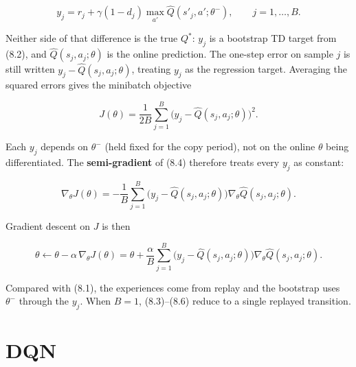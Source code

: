 \begin{equation}
y_j
=
r_j
+
\gamma(1-d_j)\max_{a'}\hat{Q}(s'_j,a';\theta^-),
\qquad
j=1,\ldots,B.
\tag{8.3}
\end{equation}

Neither side of that difference is the true $Q^*$: $y_j$ is a bootstrap TD target from (8.2), and $\hat{Q}(s_j,a_j;\theta)$ is the online prediction. The one-step error on sample $j$ is still written $y_j-\hat{Q}(s_j,a_j;\theta)$, treating $y_j$ as the regression target. Averaging the squared errors gives the minibatch objective

\begin{equation}
J(\theta)
=
\frac{1}{2B}
\sum_{j=1}^{B}
\bigl(y_j-\hat{Q}(s_j,a_j;\theta)\bigr)^2.
\tag{8.4}
\end{equation}

Each $y_j$ depends on $\theta^-$ (held fixed for the copy period), not on the online $\theta$ being differentiated. The \textbf{semi-gradient} of (8.4) therefore treats every $y_j$ as constant:

\begin{equation}
\nabla_\theta J(\theta)
=
-
\frac{1}{B}
\sum_{j=1}^{B}
\bigl(y_j-\hat{Q}(s_j,a_j;\theta)\bigr)
\nabla_\theta\hat{Q}(s_j,a_j;\theta).
\tag{8.5}
\end{equation}

Gradient descent on $J$ is then

\begin{equation}
\theta
\leftarrow
\theta
-
\alpha\,\nabla_\theta J(\theta)
=
\theta
+
\frac{\alpha}{B}
\sum_{j=1}^{B}
\bigl(y_j-\hat{Q}(s_j,a_j;\theta)\bigr)
\nabla_\theta\hat{Q}(s_j,a_j;\theta).
\tag{8.6}
\end{equation}

Compared with (8.1), the experiences come from replay and the bootstrap uses $\theta^-$ through the $y_j$. When $B=1$, (8.3)--(8.6) reduce to a single replayed transition.

\section{DQN}

